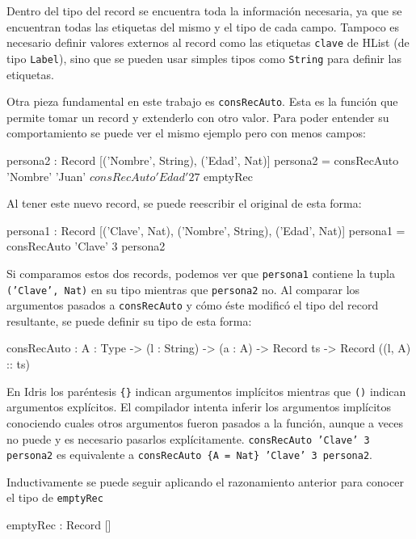 Dentro del tipo del record se encuentra toda la información necesaria, ya que se encuentran todas las etiquetas del mismo y el tipo de cada campo. Tampoco es necesario definir valores externos al record como las etiquetas \texttt{clave} de HList (de tipo \texttt{Label}), sino que se pueden usar simples tipos como \texttt{String} para definir las etiquetas.

Otra pieza fundamental en este trabajo es \texttt{consRecAuto}. Esta es la función que permite tomar un record y extenderlo con otro valor. Para poder entender su comportamiento se puede ver el mismo ejemplo pero con menos campos:

\begin{code}
persona2 : Record [('Nombre', String), ('Edad', Nat)]
persona2 = consRecAuto 'Nombre' 'Juan' $
  consRecAuto 'Edad' 27 $
  emptyRec
\end{code}

Al tener este nuevo record, se puede reescribir el original de esta forma:

\begin{code}
persona1 : Record [('Clave', Nat), ('Nombre', String), 
  ('Edad', Nat)]
persona1 = consRecAuto 'Clave' 3 persona2
\end{code}

Si comparamos estos dos records, podemos ver que \texttt{persona1} contiene la tupla \texttt{('Clave', Nat)} en su tipo mientras que \texttt{persona2} no. Al comparar los argumentos pasados a \texttt{consRecAuto} y cómo éste modificó el tipo del record resultante, se puede definir su tipo de esta forma:

\begin{code}
consRecAuto : {A : Type} -> (l : String) -> (a : A) -> 
  Record ts -> Record ((l, A) :: ts)
\end{code}

En Idris los paréntesis \texttt{\{\}} indican argumentos implícitos mientras que \texttt{()} indican argumentos explícitos. El compilador intenta inferir los argumentos implícitos conociendo cuales otros argumentos fueron pasados a la función, aunque a veces no puede y es necesario pasarlos explícitamente. \texttt{consRecAuto 'Clave' 3 persona2} es equivalente a \texttt{consRecAuto \{A = Nat\} 'Clave' 3 persona2}.

Inductivamente se puede seguir aplicando el razonamiento anterior para conocer el tipo de \texttt{emptyRec}

\begin{code}
emptyRec : Record []
\end{code}

